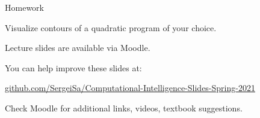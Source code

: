 \documentclass{beamer}
\begin{document}
\begin{frame}{Homework}
\begin{flushleft}

Visualize contours of a quadratic program of your choice.

\end{flushleft}
\end{frame}





\begin{frame}
\centerline{Lecture slides are available via Moodle.}
\bigskip
\centerline{You can help improve these slides at:}
\centerline{
\textcolor{blue}{\href{https://github.com/SergeiSa/Computational-Intelligence-Slides-Spring-2021}{github.com/SergeiSa/Computational-Intelligence-Slides-Spring-2021}}
}
\bigskip

\textcolor{black}{}
\bigskip

\centerline{Check Moodle for additional links, videos, textbook suggestions.}
\end{frame}
\end{document}
